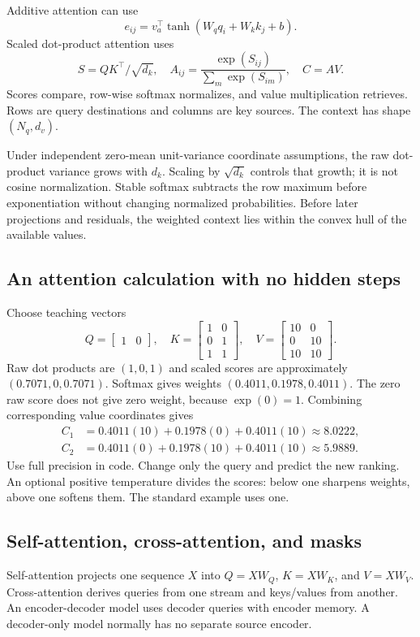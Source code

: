 \documentclass[11pt,oneside]{book}
\begin{document}
Additive attention can use
\[e_{ij}=v_a^\top\tanh(W_qq_i+W_kk_j+b).\]
Scaled dot-product attention uses
\[S=QK^\top/\sqrt{d_k},\quad
A_{ij}=\frac{\exp(S_{ij})}{\sum_m\exp(S_{im})},\quad C=AV.\]
Scores compare, row-wise softmax normalizes, and value multiplication
retrieves. Rows are query destinations and columns are key sources.
The context has shape $(N_q,d_v)$.

Under independent zero-mean unit-variance coordinate assumptions, the raw
dot-product variance grows with $d_k$. Scaling by $\sqrt{d_k}$ controls
that growth; it is not cosine normalization. Stable softmax subtracts the
row maximum before exponentiation without changing normalized probabilities.
Before later projections and residuals, the weighted context lies within
the convex hull of the available values.

\subsection{An attention calculation with no hidden steps}
Choose teaching vectors
\[Q=\begin{bmatrix}1&0\end{bmatrix},\quad
K=\begin{bmatrix}1&0\\0&1\\1&1\end{bmatrix},\quad
V=\begin{bmatrix}10&0\\0&10\\10&10\end{bmatrix}.\]
Raw dot products are $(1,0,1)$ and scaled scores are approximately
$(0.7071,0,0.7071)$. Softmax gives weights
$(0.4011,0.1978,0.4011)$. The zero raw score does not give zero weight,
because $\exp(0)=1$. Combining corresponding value coordinates gives
\begin{align*}
C_1&=0.4011(10)+0.1978(0)+0.4011(10)\approx8.0222,\\
C_2&=0.4011(0)+0.1978(10)+0.4011(10)\approx5.9889.
\end{align*}
Use full precision in code. Change only the query and predict the new
ranking. An optional positive temperature divides the scores: below one
sharpens weights, above one softens them. The standard example uses one.

\subsection{Self-attention, cross-attention, and masks}
Self-attention projects one sequence $X$ into $Q=XW_Q$, $K=XW_K$, and
$V=XW_V$. Cross-attention derives queries from one stream and keys/values
from another. An encoder-decoder model uses decoder queries with encoder
memory. A decoder-only model normally has no separate source encoder.
\end{document}
